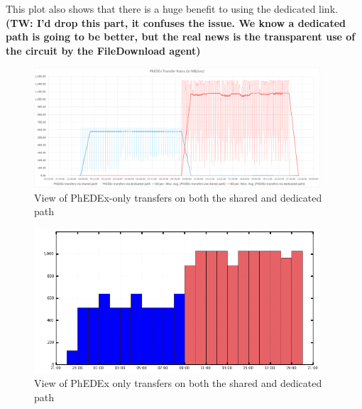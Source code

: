 This plot also shows that there is a huge benefit to using the dedicated link.
\textbf{(TW: I'd drop this part, it confuses the issue. We know a dedicated path is going to be better, but the real news is the transparent use of the circuit by the FileDownload agent)}

\begin{figure}[h]
  \centering
  \includegraphics[width=0.95\textwidth]{Figures/FileDownload_All_paths.png}
  \caption{View of PhEDEx-only transfers on both the shared and dedicated path}
  \label{fig:combined_transfers}
\end{figure} 

\begin{figure}[h]
  \centering
  \includegraphics[width=0.95\textwidth]{Figures/FileDownload_PhEDEx_all_paths.png}
  \caption{View of PhEDEx only transfers on both the shared and dedicated path}
  \label{fig:combined_phedex_transfers}
\end{figure} 